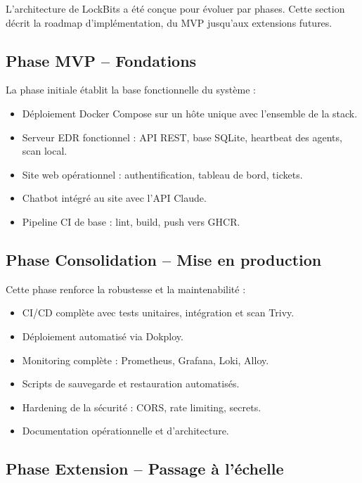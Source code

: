 L'architecture de LockBits a été conçue pour évoluer par phases. Cette
section décrit la roadmap d'implémentation, du MVP jusqu'aux extensions
futures.

\subsection{Phase MVP -- Fondations}

La phase initiale établit la base fonctionnelle du système :

\begin{itemize}
  \item Déploiement Docker Compose sur un hôte unique avec l'ensemble de
    la stack.
  \item Serveur EDR fonctionnel : API REST, base SQLite, heartbeat des
    agents, scan local.
  \item Site web opérationnel : authentification, tableau de bord, tickets.
  \item Chatbot intégré au site avec l'API Claude.
  \item Pipeline CI de base : lint, build, push vers GHCR.
\end{itemize}

\subsection{Phase Consolidation -- Mise en production}

Cette phase renforce la robustesse et la maintenabilité :

\begin{itemize}
  \item CI/CD complète avec tests unitaires, intégration et scan Trivy.
  \item Déploiement automatisé via Dokploy.
  \item Monitoring complète : Prometheus, Grafana, Loki, Alloy.
  \item Scripts de sauvegarde et restauration automatisés.
  \item Hardening de la sécurité : CORS, rate limiting, secrets.
  \item Documentation opérationnelle et d'architecture.
\end{itemize}

\subsection{Phase Extension -- Passage à l'échelle}

